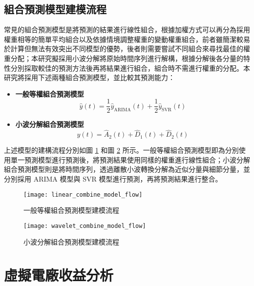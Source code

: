 \subsection{組合預測模型建模流程}

常見的組合預測模型是將預測的結果進行線性組合，根據加權方式可以再分為採用權重相等的簡單平均組合以及依據情境調整權重的變動權重組合，前者雖簡潔較易於計算但無法有效突出不同模型的優勢，後者則需要嘗試不同組合來尋找最佳的權重分配；本研究擬採用小波分解將原始時間序列進行解構，根據分解後各分量的特性分別採取較佳的預測方法後再將結果進行組合，組合時不需進行權重的分配。本研究將採用下述兩種組合預測模型，並比較其預測能力：
%
\begin{itemize}
  \item \textbf{一般等權組合預測模型} \\
        \begin{equation}\label{equation: Normal Combine Model}
          \hat{y}(t) = \frac{1}{2} \hat{y}_{\text{ARIMA}} (t) + \frac{1}{2} \hat{y}_{\text{SVR}} (t)
        \end{equation}
  \item \textbf{小波分解組合預測模型} \\
        \begin{equation}\label{equation: Wavelet Combine Model}
          \hat{y}(t) = \hat{A}_{2} (t) + \hat{D}_{1} (t) + \hat{D}_{2} (t)
        \end{equation}
\end{itemize}
%
上述模型的建構流程分別如圖 \ref{figure: Linear Combine Model Flow} 和圖 \ref{figure: Wavelet Combine Model Flow} 所示。一般等權組合預測模型即為分別使用單一預測模型進行預測後，將預測結果使用同樣的權重進行線性組合；小波分解組合預測模型則是將時間序列，透過離散小波轉換分解為近似分量與細節分量，並分別採用 ARIMA 模型與 SVR 模型進行預測，再將預測結果進行整合。

\begin{figure}[htbp]
  \centering
  \texttt{[image: linear\_combine\_model\_flow]}
  \caption[一般等權組合預測模型建模流程]{一般等權組合預測模型建模流程}
  \label{figure: Linear Combine Model Flow}
\end{figure}

\begin{figure}[htbp]
  \centering
  \texttt{[image: wavelet\_combine\_model\_flow]}
  \caption[小波分解組合預測模型建模流程]{小波分解組合預測模型建模流程}
  \label{figure: Wavelet Combine Model Flow}
\end{figure}

\section{虛擬電廠收益分析}

